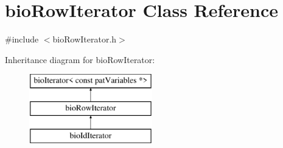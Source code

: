 \hypertarget{classbio_row_iterator}{}\section{bio\+Row\+Iterator Class Reference}
\label{classbio_row_iterator}


{\ttfamily \#include $<$bio\+Row\+Iterator.\+h$>$}

Inheritance diagram for bio\+Row\+Iterator\+:\begin{figure}[H]
\begin{center}
\leavevmode
\includegraphics[height=3.000000cm]{classbio_row_iterator}
\end{center}
\end{figure}
